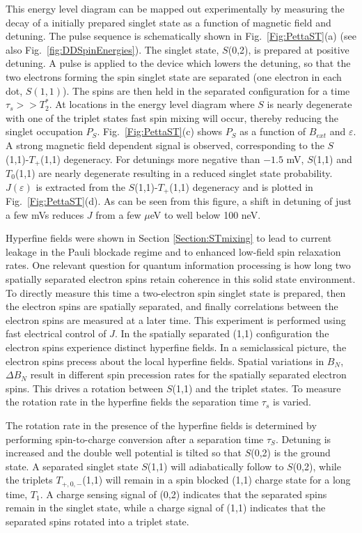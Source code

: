 \documentclass[12pt,aps,nofootinbib]{revtex4-1}
\begin{document}
This energy level diagram can be mapped out experimentally by
measuring the decay of a initially prepared singlet state as a
function of magnetic field and detuning. The pulse sequence is
schematically shown in Fig.~\ref{Fig:PettaST}(a) (see also Fig.~\ref{fig:DDSpinEnergies}). The singlet
state, $S$(0,2), is prepared at positive detuning. A pulse is
applied to the device which lowers the detuning, so that the two electrons forming the spin singlet state are separated (one electron in each dot, $S(1,1)$). The spins are then held in the separated
configuration for a time $\tau_s$$>>$$T_2^*$. At locations in the
energy level diagram where $S$ is nearly degenerate with one of the
triplet states fast spin mixing will occur, thereby reducing the singlet occupation $P_S$. Fig.~\ref{Fig:PettaST}(c) shows $P_S$ as a function of $B_{ext}$ and $\varepsilon$. A strong magnetic field dependent signal is observed,
corresponding to the $S$(1,1)-$T_+$(1,1) degeneracy. For detunings
more negative than $-1.5$ mV, $S$(1,1) and $T_0$(1,1) are nearly degenerate
resulting in a reduced singlet state probability. $J(\varepsilon)$ is
extracted from the $S$(1,1)-$T_+$(1,1) degeneracy and is plotted in
Fig.~\ref{Fig:PettaST}(d). As can be seen from this figure, a shift in detuning of just a few mVs reduces $J$
from a few $\mu$eV to well below 100 neV.

Hyperfine fields were shown in Section \ref{Section:STmixing} to
lead to current leakage in the Pauli blockade regime and to enhanced
low-field spin relaxation rates. One relevant question for quantum information processing is how long two spatially separated electron spins retain coherence in this solid state environment. To directly
measure this time a two-electron spin singlet state is prepared, then the electron spins are spatially separated, and finally
correlations between the electron spins are measured at a later time. This
experiment is performed using fast electrical control of $J$. In the spatially separated (1,1)
configuration the electron spins experience distinct hyperfine
fields. In a semiclassical picture, the electron spins precess
about the local hyperfine fields. Spatial variations in $B_{N}$, $\Delta B_{N}$
result in different spin precession rates for the spatially
separated electron spins. This drives a rotation between $S$(1,1)
and the triplet states. To measure the rotation rate in the hyperfine
fields the separation time $\tau_s$ is varied.

The rotation rate in the presence of the hyperfine fields is
determined by performing spin-to-charge conversion after a
separation time $\tau_S$. Detuning is increased and the double
well potential is tilted so that $S$(0,2) is the ground state. A
separated singlet state $S$(1,1) will adiabatically follow to
$S$(0,2), while the triplets $T_{+,0,-}$(1,1) will remain in a spin
blocked (1,1) charge state for a long time, $T_1$. A charge sensing
signal of (0,2) indicates that the separated spins remain in the
singlet state, while a charge signal of (1,1) indicates that the
separated spins rotated into a triplet state.
\end{document}
